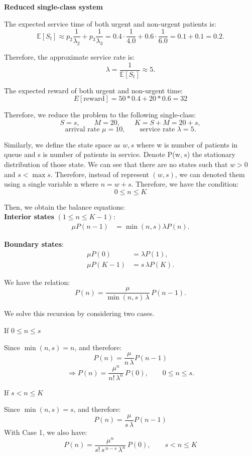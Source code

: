 \documentclass{article}
\begin{document}
\textbf{Reduced single-class system}

The expected service time of both urgent and non-urgent patients is:
\[
\mathbb{E}[S_t]
\approx
p_2 \frac{1}{\lambda_2} + p_3 \frac{1}{\lambda_3}
=
0.4 \cdot \frac{1}{4.0} + 0.6 \cdot \frac{1}{6.0}
=
0.1 + 0.1
=
0.2.
\]

Therefore, the approximate service rate is:
\[
\lambda
=
\frac{1}{\mathbb{E}[S_t]}
\approx
5.
\]


The expected reward of both urgent and non-urgent time:
\[E[\text{reward}] = 50 * 0.4 + 20 * 0.6 = 32\]


Therefore, we reduce the problem to the following single-class:
\[
S = s, \qquad
M = 20, \qquad
K = S + M = 20 + s,
\]
\[
\text{arrival rate } \mu = 10,
\qquad
\text{service rate } \lambda = 5.
\]


Similarly, we define the state space as $w, s$ where
w is number of patients in queue and s is number of patients in service.
Denote P(w, s) the stationary distribution of those state. We can see that there are no
states such that $w > 0$ and $s < \max s$. Therefore, instead of represent $(w, s)$, we can denoted them
using a single variable n where $n = w + s$. Therefore, we have the condition:
\[0 \leq n \leq K\]

Then, we obtain the balance equations:\\

\textbf{Interior states} $(1 \le n \le K-1)$:
\begin{align*}
\mu P(n-1)
&=
\min(n,s)\lambda P(n).
\end{align*}

\textbf{Boundary states}:
\begin{align*}
\mu P(0) &= \lambda P(1), \\
\mu P(K-1) &= s\,\lambda P(K).
\end{align*}

We have the relation:
\[
P(n)
=
\frac{\mu}{\min(n,s)\,\lambda} \, P(n-1).
\]

\medskip

We solve this recursion by considering two cases.

If $0 \le n \le s$

Since $\min(n,s)=n$, and therefore:
\[P(n) = \frac{\mu}{n\,\lambda} P(n-1)\]
\[\Rightarrow P(n) = \frac{\mu^n}{n!\,\lambda^n} \, P(0),
\qquad 0 \le n \le s.
\]

If $s < n \le K$

Since $\min(n,s)=s$, and therefore:
\[P(n) = \frac{\mu}{s\,\lambda} P(n-1)\]
With Case 1, we also have:
\[P(n) = \frac{\mu^n}{s!\,s^{\,n-s}\,\lambda^n} \, P(0), \qquad s < n \le K\]
\end{document}
